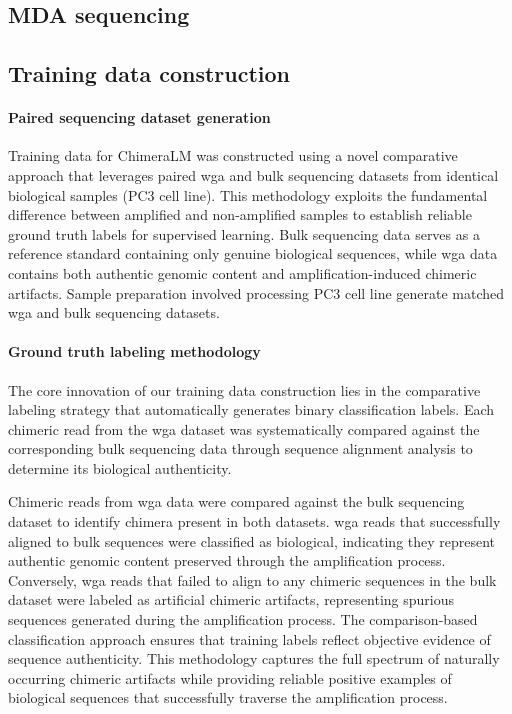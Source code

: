 \documentclass[pdflatex,sn-nature]{sn-jnl}%
\theoremstyle{thmstyleone}%
\theoremstyle{thmstyletwo}%
\theoremstyle{thmstylethree}%
\begin{document}
\subsection*{MDA sequencing}

\subsection*{Training data construction}

\paragraph{Paired sequencing dataset generation}
Training data for ChimeraLM was constructed using a novel comparative approach that leverages paired \gls{wga} and bulk sequencing datasets from identical biological samples (PC3 cell line).
This methodology exploits the fundamental difference between amplified and non-amplified samples to establish reliable ground truth labels for supervised learning.
Bulk sequencing data serves as a reference standard containing only genuine biological sequences, while \gls{wga} data contains both authentic genomic content and amplification-induced chimeric artifacts.
Sample preparation involved processing PC3 cell line generate matched \gls{wga} and bulk sequencing datasets.

\paragraph{Ground truth labeling methodology}
The core innovation of our training data construction lies in the comparative labeling strategy that automatically generates binary classification labels.
Each chimeric read from the \gls{wga} dataset was systematically compared against the corresponding bulk sequencing data through sequence alignment analysis to determine its biological authenticity.

Chimeric reads from \gls{wga} data were compared against the bulk sequencing dataset to identify chimera present in both datasets.
\gls{wga} reads that successfully aligned to bulk sequences were classified as biological, indicating they represent authentic genomic content preserved through the amplification process.
Conversely, \gls{wga} reads that failed to align to any chimeric sequences in the bulk dataset were labeled as artificial chimeric artifacts, representing spurious sequences generated during the amplification process.
The comparison-based classification approach ensures that training labels reflect objective evidence of sequence authenticity.
This methodology captures the full spectrum of naturally occurring chimeric artifacts while providing reliable positive examples of biological sequences that successfully traverse the amplification process.
\end{document}
